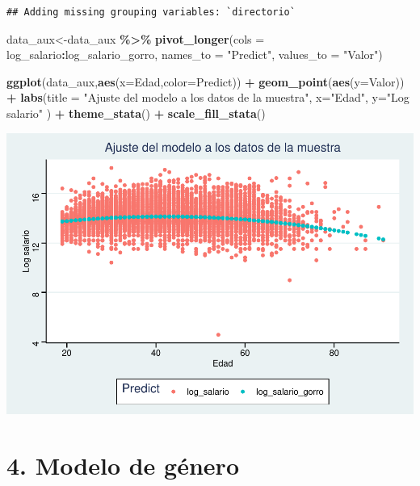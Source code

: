 \documentclass[
]{article}
\newenvironment{Shaded}{\begin{snugshade}}{\end{snugshade}}
\newcommand{\AttributeTok}[1]{\textcolor[rgb]{0.13,0.29,0.53}{#1}}
\newcommand{\FunctionTok}[1]{\textcolor[rgb]{0.13,0.29,0.53}{\textbf{#1}}}
\newcommand{\NormalTok}[1]{#1}
\newcommand{\OtherTok}[1]{\textcolor[rgb]{0.56,0.35,0.01}{#1}}
\newcommand{\SpecialCharTok}[1]{\textcolor[rgb]{0.81,0.36,0.00}{\textbf{#1}}}
\newcommand{\StringTok}[1]{\textcolor[rgb]{0.31,0.60,0.02}{#1}}
\begin{document}
\begin{verbatim}
## Adding missing grouping variables: `directorio`
\end{verbatim}

\begin{Shaded}
\begin{Highlighting}[]
\NormalTok{data\_aux}\OtherTok{\textless{}{-}}\NormalTok{data\_aux }\SpecialCharTok{\%\textgreater{}\%}  \FunctionTok{pivot\_longer}\NormalTok{(}\AttributeTok{cols =}\NormalTok{ log\_salario}\SpecialCharTok{:}\NormalTok{log\_salario\_gorro,}
\AttributeTok{names\_to =} \StringTok{"Predict"}\NormalTok{,}
\AttributeTok{values\_to =} \StringTok{"Valor"}\NormalTok{)}

\FunctionTok{ggplot}\NormalTok{(data\_aux,}\FunctionTok{aes}\NormalTok{(}\AttributeTok{x=}\NormalTok{Edad,}\AttributeTok{color=}\NormalTok{Predict)) }\SpecialCharTok{+}
\FunctionTok{geom\_point}\NormalTok{(}\FunctionTok{aes}\NormalTok{(}\AttributeTok{y=}\NormalTok{Valor)) }\SpecialCharTok{+}
\FunctionTok{labs}\NormalTok{(}\AttributeTok{title =} \StringTok{"Ajuste del modelo a los datos de la muestra"}\NormalTok{,}
\AttributeTok{x=}\StringTok{"Edad"}\NormalTok{,}
\AttributeTok{y=}\StringTok{"Log salario"}
\NormalTok{) }\SpecialCharTok{+}
\FunctionTok{theme\_stata}\NormalTok{() }\SpecialCharTok{+}
\FunctionTok{scale\_fill\_stata}\NormalTok{()}
\end{Highlighting}
\end{Shaded}

\includegraphics{Taller-1_files/figure-latex/unnamed-chunk-22-1.pdf}

\hypertarget{modelo-de-guxe9nero}{%
\section{4. Modelo de género}\label{modelo-de-guxe9nero}}
\end{document}
